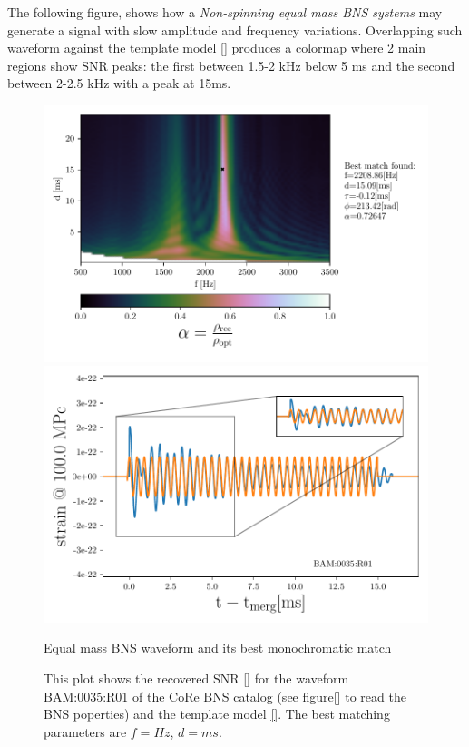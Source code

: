The following figure, shows how a \textit{Non-spinning equal mass BNS systems} may generate a signal with slow amplitude and frequency variations. Overlapping such waveform against  the template model \ref{} produces a colormap where 2 main regions show SNR peaks: the first between 1.5-2 kHz below 5 ms and the second between 2-2.5 kHz with a peak at 15ms. 

\begin{figure}[!htbp]
\begin{center}
\begin{minipage}[t]{0.5\linewidth}
\vspace{0pt}
\includegraphics[scale=0.6,trim={2mm 0 35mm 0},clip]{images/Data_analysis/results/2D_grid_1.pdf}
\end{minipage}%
\begin{minipage}[t]{0.5\linewidth}
\vspace{20pt}
\includegraphics[scale=0.45]{images/Data_analysis/results/2D_grid_2.pdf}
\end{minipage}
\captionsetup{width=0.8\textwidth}
\caption{Equal mass BNS waveform and its best monochromatic match}
\caption*{This plot shows the recovered SNR \ref{} for the waveform BAM:0035:R01 of the CoRe BNS catalog \cite{}(see figure\ref{} to read the BNS poperties) and the template model \ref{}. The best matching parameters are $f=Hz$, $d=ms$.}
\end{center}
\end{figure}

